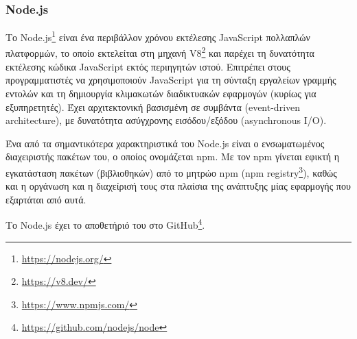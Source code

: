 \subsubsection{Node.js} \label{subsection:4-2-1-1-node.js}


Το Node.js\footnote{\url{https://nodejs.org/}} είναι ένα περιβάλλον χρόνου εκτέλεσης JavaScript πολλαπλών πλατφορμών, το οποίο εκτελείται στη μηχανή V8\footnote{\url{https://v8.dev/}} και παρέχει τη δυνατότητα εκτέλεσης κώδικα JavaScript εκτός περιηγητών ιστού. Επιτρέπει στους προγραμματιστές να χρησιμοποιούν JavaScript για τη σύνταξη εργαλείων γραμμής εντολών και τη δημιουργία κλιμακωτών διαδικτυακών εφαρμογών (κυρίως για εξυπηρετητές). Έχει αρχιτεκτονική βασισμένη σε συμβάντα (event-driven architecture), με δυνατότητα ασύγχρονης εισόδου/εξόδου (asynchronous I/O).\cite{4.2-node.js}

Ένα από τα σημαντικότερα χαρακτηριστικά του Node.js είναι ο ενσωματωμένος διαχειριστής πακέτων του, ο οποίος ονομάζεται npm. Με τον npm γίνεται εφικτή η εγκατάσταση πακέτων (βιβλιοθηκών) από το μητρώο npm (npm registry\footnote{\url{https://www.npmjs.com/}}), καθώς και η οργάνωση και η διαχείρισή τους στα πλαίσια της ανάπτυξης μίας εφαρμογής που εξαρτάται από αυτά.

Το Node.js έχει το αποθετήριό του στο GitHub\footnote{\url{https://github.com/nodejs/node}}.
